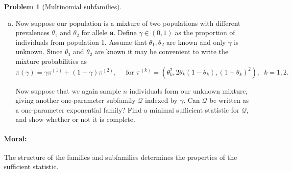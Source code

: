 \documentclass{article}
\newcommand{\cQ}{\mathcal{Q}}
\theoremstyle{definition}
\newtheorem{problem}{Problem}
\begin{document}
\begin{problem}[Multinomial subfamilies]
\begin{enumerate}[(a)]
    


  \item Now suppose our population is a mixture of two populations with different prevalences $\theta_1$ and $\theta_2$ for allele {\bf a}. Define $\gamma \in (0,1)$ as the proportion of individuals from population 1. Assume that $\theta_1,\theta_2$ are known and only $\gamma$ is unknown. Since $\theta_1$ and $\theta_2$ are known it may be convenient to write the mixture probabilities as
    \[
    \pi(\gamma) = \gamma\pi^{(1)} + (1-\gamma)\pi^{(2)}, \quad \text{ for } \pi^{(k)} = (\theta_k^2, 2\theta_k(1-\theta_k), (1-\theta_k)^2), \;\;k=1,2.
    \]

    Now suppose that we again sample $n$ individuals form our unknown mixture, giving another one-parameter subfamily $\cQ$ indexed by $\gamma$. Can $\cQ$ be written as a one-parameter exponential family? Find a minimal sufficient statistic for $\cQ$, and show whether or not it is complete.
  \end{enumerate}

  \paragraph{Moral:} The structure of the families and subfamilies determines the properties of the sufficient statistic.

\end{problem}
\end{document}
